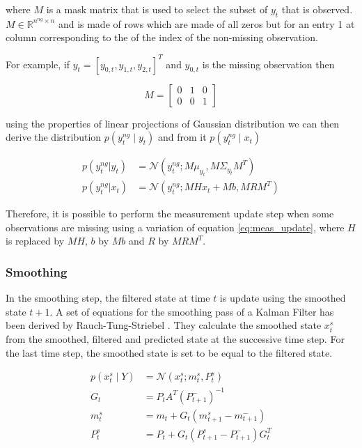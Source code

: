 \documentclass{article}
\newcommand{\norm}[3]{\mathcal{N}\left(#1; #2, #3\right)} %
\begin{document}
where $M$ is a mask matrix that is used to select the subset of $y_t$ that is observed. $M \in \mathbb{R}^{n^{ng} \times n}$ and is made of rows which are made of all zeros but for an entry 1 at column corresponding to the of the index of the non-missing observation.

For example, if $y_t = [y_{0,t}, y_{1,t}, y_{2,t}]^T$ and $y_{0,t}$ is the missing observation then

\begin{equation}
 M = \left[\begin{array}{ccc}
    0 & 1 & 0 \\
    0 & 0 & 1
\end{array}\right]
\end{equation}

 using the properties of linear projections of Gaussian distribution we can then derive the distribution $p(y^{ng}_t \mid y_t)$ and from it $p(y^{ng}_t \mid x_t)$ 

\begin{align}
   p(y^{ng}_t|y_t) &= \norm{y^{ng}_t}{M\mu_{y_t}}{M\Sigma_{y_t}M^T} \label{eq:partial_obs}\\
  p(y^{ng}_t|x_t) &= \norm{y^{ng}_t}{MHx_t + Mb}{MRM^T}\label{eq:partial_obs_state}
\end{align}

Therefore, it is possible to perform the measurement update step when some observations are missing using a variation of equation \ref{eq:meas_update}, where $H$ is replaced by $MH$, $b$ by $Mb$ and $R$ by $MRM^T$.

\subsubsection{Smoothing}

In the smoothing step, the filtered state at time $t$ is update using the smoothed state ${t+1}$. A set of equations for the smoothing pass of a Kalman Filter has been derived by Rauch-Tung-Striebel \cite{rauch_maximum_1965}. They calculate the smoothed state $x_t^s$ from the smoothed, filtered and predicted state at the successive time step.
For the last time step, the smoothed state is set to be equal to the filtered state.

\begin{align}
    p(x_t^s \mid Y) &= \norm{x_t^s}{m_t^s}{P_t^s} \label{eq:smoother}\\
    G_t &= P_tA^T(P_{t+1}^-)^{-1} \label{eq:smoother:gain}\\
    m_t^s &= m_t + G_t(m_{t+1}^s - m_{t+1}^-) \label{eq:smoother:mean}\\
    P_t^s &= P_t + G_t(P_{t+1}^s - P_{t+1}^-)G_t^T \label{eq:smoother:cov}
\end{align}
\end{document}
